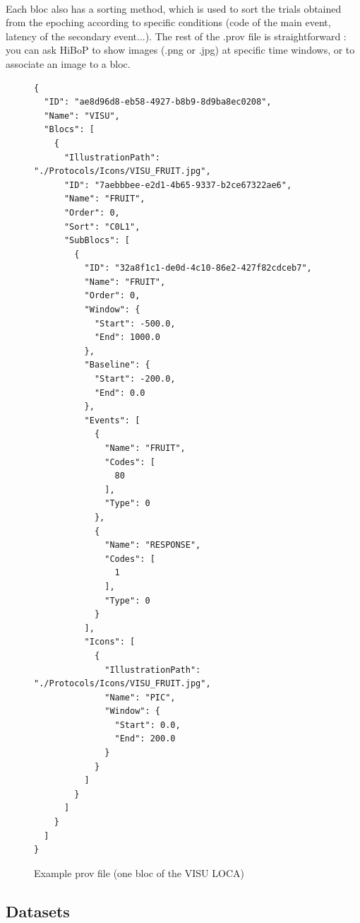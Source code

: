\documentclass[a4paper]{article}
\begin{document}
\paragraph{} Each bloc also has a sorting method, which is used to sort the trials obtained from the epoching according to specific conditions (code of the main event, latency of the secondary event...). The rest of the .prov file is straightforward : you can ask HiBoP to show images (.png or .jpg) at specific time windows, or to associate an image to a bloc.
\begin{figure}[H]
\begin{lstlisting}
{
  "ID": "ae8d96d8-eb58-4927-b8b9-8d9ba8ec0208",
  "Name": "VISU",
  "Blocs": [
    {
      "IllustrationPath": "./Protocols/Icons/VISU_FRUIT.jpg",
      "ID": "7aebbbee-e2d1-4b65-9337-b2ce67322ae6",
      "Name": "FRUIT",
      "Order": 0,
      "Sort": "C0L1",
      "SubBlocs": [
        {
          "ID": "32a8f1c1-de0d-4c10-86e2-427f82cdceb7",
          "Name": "FRUIT",
          "Order": 0,
          "Window": {
            "Start": -500.0,
            "End": 1000.0
          },
          "Baseline": {
            "Start": -200.0,
            "End": 0.0
          },
          "Events": [
            {
              "Name": "FRUIT",
              "Codes": [
                80
              ],
              "Type": 0
            },
            {
              "Name": "RESPONSE",
              "Codes": [
                1
              ],
              "Type": 0
            }
          ],
          "Icons": [
            {
              "IllustrationPath": "./Protocols/Icons/VISU_FRUIT.jpg",
              "Name": "PIC",
              "Window": {
                "Start": 0.0,
                "End": 200.0
              }
            }
          ]
        }
      ]
    }
  ]
}
\end{lstlisting}
\caption{\label{provFile}Example prov file (one bloc of the VISU LOCA)}
\end{figure}
\subsection{Datasets}
\end{document}

